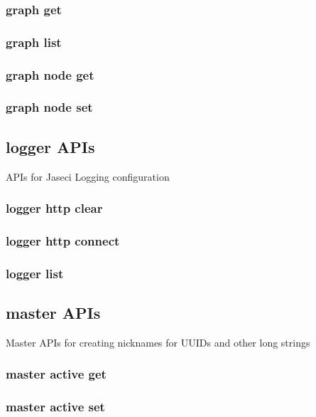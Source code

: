 \subsubsection{graph get}

\subsubsection{graph list}

\subsubsection{graph node get}

\subsubsection{graph node set}

\subsection{logger APIs}

APIs for Jaseci Logging configuration

\subsubsection{logger http clear}

\subsubsection{logger http connect}

\subsubsection{logger list}

\subsection{master APIs}

Master APIs for creating nicknames for UUIDs and other long strings
\par


\subsubsection{master active get}

\subsubsection{master active set}

